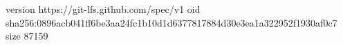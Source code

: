 version https://git-lfs.github.com/spec/v1
oid sha256:0896acb041ff6be3aa24fc1b10d1d6377817884d30e3ea1a322952f1930af0c7
size 87159
